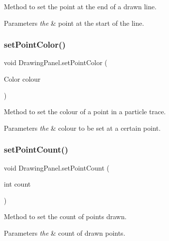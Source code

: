 Method to set the point at the end of a drawn line. 


\begin{DoxyParams}{Parameters}
{\em the} & point at the start of the line. \\
\hline
\end{DoxyParams}
\mbox{\label{class_drawing_panel_a9e295a2f6aec0c5e85240324dff07d90}} 
\subsubsection{\texorpdfstring{set\+Point\+Color()}{setPointColor()}}
{\footnotesize\ttfamily void Drawing\+Panel.\+set\+Point\+Color (\begin{DoxyParamCaption}\item[{Color}]{colour }\end{DoxyParamCaption})}



Method to set the colour of a point in a particle trace. 


\begin{DoxyParams}{Parameters}
{\em the} & colour to be set at a certain point. \\
\hline
\end{DoxyParams}
\mbox{\label{class_drawing_panel_a3c4886846e221ed78b1859d0d022cf8f}} 
\subsubsection{\texorpdfstring{set\+Point\+Count()}{setPointCount()}}
{\footnotesize\ttfamily void Drawing\+Panel.\+set\+Point\+Count (\begin{DoxyParamCaption}\item[{int}]{count }\end{DoxyParamCaption})}



Method to set the count of points drawn. 


\begin{DoxyParams}{Parameters}
{\em the} & count of drawn points. \\
\hline
\end{DoxyParams}
\mbox{\label{class_drawing_panel_a7eae2c9bc64af0b4bcb177370598b3ad}} 
